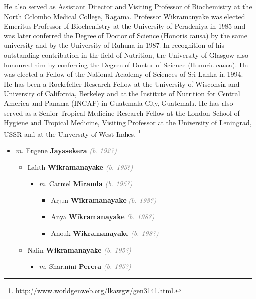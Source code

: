 \documentclass[10pt, openany]{book}
\begin{document}
\begin{itemize}
{\begin{itemize}
{\begin{itemize}
{\begin{itemize}
{{{He also served as Assistant Director and Visiting Professor of Biochemistry at the North Colombo Medical College, Ragama. Professor Wikramanyake was elected Emeritus Professor of Biochemistry at the University of Peradeniya in 1985 and was later conferred the Degree of Doctor of Science (Honoris causa) by the same university and by the University of Ruhuna in 1987. In recognition of his outstanding contribution in the field of Nutrition, the University of Glasgow also honoured him by conferring the Degree of Doctor of Science (Honoris causa). He was elected a Fellow of the National Academy of Sciences of Sri Lanka in 1994.
He has been a Rockefeller Research Fellow at the University of Wisconsin and University of California, Berkeley and at the Institute of Nutrition for Central America and Panama (INCAP) in Guatemala City, Guatemala. He has also served as a Senior Tropical Medicine Research Fellow at the London School of Hygiene and Tropical Medicine, Visiting Professor at the University of Leningrad, USSR and at the University of West Indies.
\footnote{\url{http://www.worldgenweb.org/lkawgw/gen3141.html.}}}}
\begin{itemize}
\item{\textit{m.} Eugene \textbf{Jayasekera} \textcolor{gray}{\textit{(b. 192?)}}   \label{couple:00003743:00003747} \begin{itemize}
\item{Lalith \textbf{Wikramanayake} \textcolor{gray}{\textit{(b. 195?)}}
\begin{itemize}
\item{\textit{m.} Carmel \textbf{Miranda} \textcolor{gray}{\textit{(b. 195?)}}   \label{couple:00003744:00003751} \begin{itemize}
\item{Arjun \textbf{Wikramanayake} \textcolor{gray}{\textit{(b. 198?)}}
 }
\item{Anya \textbf{Wikramanayake} \textcolor{gray}{\textit{(b. 198?)}}
 }
\item{Anouk \textbf{Wikramanayake} \textcolor{gray}{\textit{(b. 198?)}}
 }
\end{itemize}}
\end{itemize}
 }
\item{Nalin \textbf{Wikramanayake} \textcolor{gray}{\textit{(b. 195?)}}
\begin{itemize}
\item{\textit{m.} Sharmini \textbf{Perera} \textcolor{gray}{\textit{(b. 195?)}}   \label{couple:00003745:00003752} \begin{itemize}

\end{itemize}}
\end{itemize}}
\end{itemize}}
\end{itemize}}
\end{itemize}}
\end{itemize}}
\end{itemize}}
\end{itemize}
\end{document}
